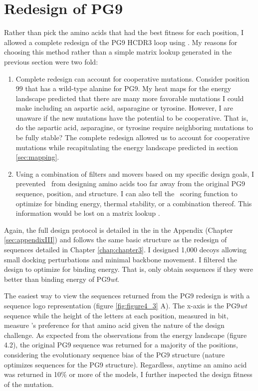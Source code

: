 \section{Redesign of PG9}
Rather than pick the amino acids that had the best fitness for each position, I allowed a complete redesign of the PG9 HCDR3 loop using \rosettadesign. My reasons for choosing this method rather than a simple matrix lookup generated in the previous section were two fold:
\begin{enumerate}
\item Complete redesign can account for cooperative mutations. Consider position 99 that has a wild-type alanine for PG9. My heat maps for the energy landscape predicted that there are many more favorable mutations I could make including an aspartic acid, asparagine or tyrosine. However, I are unaware if the new mutations have the potential to be cooperative. That is, do the aspartic acid, asparagine, or tyrosine require neighboring mutations to be fully stable? The complete redesign allowed us to account for cooperative mutations while recapitulating the energy landscape predicted in section \ref{sec:mapping}.
\item Using a combination of filters and movers based on my specific design goals, I prevented \rosetta~from designing amino acids too far away from the original PG9 sequence, position, and structure. I can also tell the \rosetta~scoring function to optimize for binding energy, thermal stability, or a combination thereof. This information would be lost on a matrix lookup \citep{Fleishman:2011ji,Kaufmann:2010ea,Kuhlman:2000tc}.
\end{enumerate}

Again, the full design protocol is detailed in the in the Appendix (Chapter \ref{sec:appendixIII}) and follows the same basic structure as the redesign of sequences detailed in Chapter \ref{chap:chapter3}. I designed 1,000 decoys allowing small docking perturbations and minimal backbone movement. I filtered the design to optimize for binding energy. That is, only obtain sequences if they were better than binding energy of PG9\textit{wt}.

The easiest way to view the sequences returned from the PG9 redesign is with a sequence logo representation (figure \ref{fig:figure4_3} A). The x-axis is the PG9\textit{wt} sequence while the height of the letters at each position, measured in bit, measure \rosetta's preference for that amino acid given the nature of the design challenge. As expected from the observations from the energy landscape (figure 4.2), the original PG9 sequence was returned for a majority of the positions, considering the evolutionary sequence bias of the PG9 structure (nature optimizes sequences for the PG9 structure).  Regardless, anytime an amino acid was returned in 10\% or more of the models, I further inspected the design fitness of the mutation.

